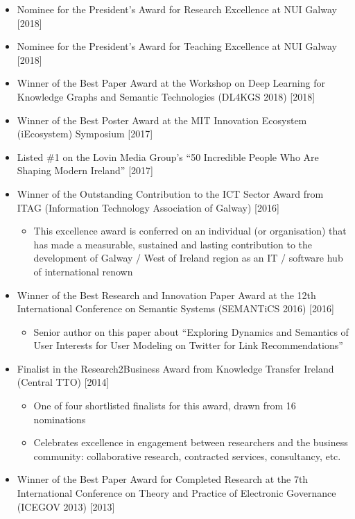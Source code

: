 \documentclass[10pt,a4paper]{res} %
\begin{document}
\begin{resume}
\begin{itemize} \itemsep -2pt
\item Nominee for the President's Award for Research Excellence at NUI Galway [2018]
\item Nominee for the President's Award for Teaching Excellence at NUI Galway [2018]
\item Winner of the Best Paper Award at the Workshop on Deep Learning for Knowledge Graphs and Semantic Technologies (DL4KGS 2018) [2018]
\item Winner of the Best Poster Award at the MIT Innovation Ecosystem (iEcosystem) Symposium [2017]
\item Listed \#1 on the Lovin Media Group's ``50 Incredible People Who Are Shaping Modern Ireland'' [2017]
\item Winner of the Outstanding Contribution to the ICT Sector Award from ITAG (Information Technology Association of Galway) [2016]
\begin{itemize} \itemsep -2pt
\item This excellence award is conferred on an individual (or organisation) that has made a measurable, sustained and lasting contribution to the development of Galway / West of Ireland region as an IT / software hub of international renown
\end{itemize}
\item Winner of the Best Research and Innovation Paper Award at the 12th International Conference on Semantic Systems (SEMANTiCS 2016) [2016]
\begin{itemize} \itemsep -2pt
\item Senior author on this paper about ``Exploring Dynamics and Semantics of User Interests for User Modeling on Twitter for Link Recommendations''
\end{itemize}
\item Finalist in the Research2Business Award from Knowledge Transfer Ireland (Central TTO) [2014]
\begin{itemize} \itemsep -2pt
\item One of four shortlisted finalists for this award, drawn from 16 nominations
\item Celebrates excellence in engagement between researchers and the business community: collaborative research, contracted services, consultancy, etc.
\end{itemize}
\item Winner of the Best Paper Award for Completed Research at the 7th International Conference on Theory and Practice of Electronic Governance (ICEGOV 2013) [2013]

\end{itemize}
\end{resume}
\end{document}
